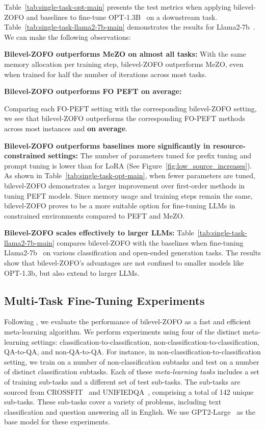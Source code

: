 Table~\ref{tab:single-task-opt-main} presents the test metrics when applying bilevel-ZOFO and baselines to fine-tune OPT-1.3B~\citep{OPT} on a downstream task. Table~\ref{tab:single-task-llama2-7b-main} demonstrates the results for Llama2-7b~\citep{Llama2}. We can make the following observations:

\textbf{Bilevel-ZOFO outperforms MeZO on almost all tasks:} 
With the same memory allocation per training step, bilevel-ZOFO outperforms MeZO, even when trained for half the number of iterations across most tasks. 

\textbf{Bilevel-ZOFO outperforms FO PEFT on average:} 

Comparing each FO-PEFT setting with the corresponding bilevel-ZOFO setting, we see that bilevel-ZOFO outperforms the corresponding FO-PEFT methods across most instances and \textbf{on average}.


\textbf{Bilevel-ZOFO outperforms baselines more significantly in resource-constrained settings:} 
 The number of parameters tuned for prefix tuning and prompt tuning is lower than for LoRA (See Figure~\ref{fig:low_source_increases}). As shown in Table~\ref{tab:single-task-opt-main}, when fewer parameters are tuned, bilevel-ZOFO demonstrates a larger improvement over first-order methods in tuning PEFT models. Since memory usage and training steps remain the same, bilevel-ZOFO proves to be a more suitable option for fine-tuning LLMs in constrained environments compared to PEFT and MeZO.


\textbf{Bilevel-ZOFO scales effectively to larger LLMs:} Table~\ref{tab:single-task-llama2-7b-main} compares bilevel-ZOFO with the baselines when fine-tuning Llama2-7b~\citep{Llama2} on various classification and open-ended generation tasks. The results show that bilevel-ZOFO's advantages are not confined to smaller models like OPT-1.3b, but also extend to larger LLMs.


\subsection{Multi-Task Fine-Tuning Experiments}
Following \citet{MinLZH22MetaICL}, we evaluate the performance of bilevel-ZOFO as a fast and efficient meta-learning algorithm. We perform experiments using four of the distinct meta-learning settings: classification-to-classification, non-classification-to-classification, QA-to-QA, and non-QA-to-QA. For instance, in non-classification-to-classification setting, we train on a number of non-classification subtasks and test on a number of distinct classification subtasks. Each of these \emph{meta-learning tasks} includes a set of training sub-tasks and a different set of test sub-tasks. The sub-tasks are sourced from CROSSFIT~\citep{YeLR21CrossfitFewShot} and UNIFIEDQA~\citep{KhashabiMKSTCH20}, comprising a total of 142 unique sub-tasks. These sub-tasks cover a variety of problems, including text classification and question answering all in English. We use GPT2-Large~\cite{radford2019gpt2} as the base model for these experiments.


